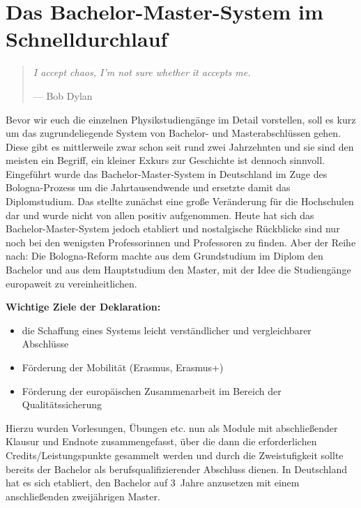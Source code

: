\section{Das Bachelor-Master-System im Schnelldurchlauf}

\begin{multicols}{2}
\begin{quote}
	\textit{\foreignlanguage{english}{I accept chaos, I'm not sure whether it accepts me.}}

	\hfill--- Bob Dylan
\end{quote}
Bevor wir euch die einzelnen Physikstudiengänge im Detail vorstellen, soll es kurz um das zugrundeliegende System von Bachelor- und Masterabschlüssen gehen.
Diese gibt es mittlerweile zwar schon seit rund zwei Jahrzehnten und sie sind den meisten ein Begriff, ein kleiner Exkurs zur Geschichte ist dennoch sinnvoll.
Eingeführt wurde das Bachelor-Master-System in Deutschland im Zuge des Bologna-Prozess um die Jahrtausendwende und ersetzte damit das Diplomstudium.
Das stellte zunächst eine große Veränderung für die Hochschulen dar und wurde nicht von allen positiv aufgenommen.
Heute hat sich das Bachelor-Master-System jedoch etabliert und nostalgische Rückblicke sind nur noch bei den wenigsten Professorinnen und Professoren zu finden.
Aber der Reihe nach: Die Bologna-Reform machte aus dem Grundstudium im Diplom den Bachelor und aus dem Hauptstudium den Master, mit der Idee die Studiengänge europaweit zu vereinheitlichen.

\textbf{Wichtige Ziele der Deklaration:}
\begin{itemize}
	\item die Schaffung eines Systems leicht verständlicher und vergleichbarer Abschlüsse
	\item Förderung der Mobilität (Erasmus, Erasmus+)
	\item Förderung der europäischen Zusammenarbeit im Bereich der Qualitätssicherung
\end{itemize}

Hierzu wurden Vorlesungen, Übungen etc. nun als Module mit abschließender Klausur und Endnote zusammengefasst, über die dann die erforderlichen Credits/Leistungspunkte gesammelt werden und durch die Zweistufigkeit sollte bereits der Bachelor als berufsqualifizierender Abschluss dienen.
In Deutschland hat es sich etabliert, den Bachelor auf 3~Jahre anzusetzen mit einem anschließenden zweijährigen Master.


\end{multicols}
